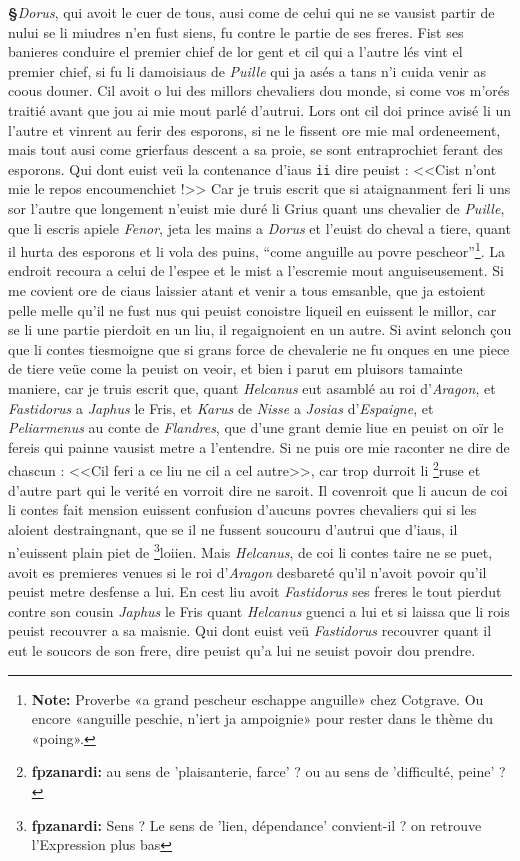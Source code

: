 \documentclass[12pt]{article} %
\newcommand{\persName}[1]{\emph{#1}} %
\newcommand{\placeName}[1]{\emph{#1}} %
\newcommand{\num}[1]{\texttt{#1}}    %
\newcommand{\supplied}[1]{\textlangle#1\textrangle} %
\newcommand{\fnnote}[1]{\footnote{\textbf{Note:} #1}} %
\newcommand{\fnfpz}[1]{\footnote{\textbf{fpzanardi:} #1}} %
\newcommand{\del}[1]{\sout{#1}}      %
\newcounter{paranum}
\newcommand{\pnum}{\stepcounter{paranum}\textbf{§\arabic{paranum}}\quad}
\begin{document}
\pnum \persName{Dorus}, qui avoit le cuer de tous, ausi come de celui qui ne se vausist partir de nului se li miudres n'en fust siens, fu contre le partie de ses freres. Fist ses banieres conduire el premier chief de lor gent et cil qui a l'autre lés vint el premier chief, si fu li damoisiaus de \placeName{Puille} qui ja asés a tans n'i cuida venir as coous douner. Cil avoit o lui des millors chevaliers dou monde, si come vos m'orés traitié avant que jou ai mie mout parlé d'autrui. Lors ont cil doi prince avisé li un l'autre et vinrent au ferir des esporons, si ne le fissent ore mie mal ordeneement, mais tout ausi come g\del{r}ierfaus descent a sa proie, se sont entraprochiet ferant des esporons. Qui dont euist veü la contenance d'iaus \num{ii} dire peuist : <<Cist n'ont mie le repos encoumenchiet !>> Car je truis escrit que si ataignanment feri li uns sor l'autre que longement n'euist mie duré li Grius quant uns chevalier de \placeName{Puille}, que li escris apiele \persName{Fenor}, jeta les mains a \persName{Dorus} et l'euist do cheval a tiere, quant il hurta des esporons et li vola des puins, ``come anguille au povre pescheor''\fnnote{Proverbe «a grand pescheur eschappe anguille» chez Cotgrave. Ou encore «anguille peschie, n'iert ja ampoignie» pour rester dans le thème du «poing».}. La endroit recoura a celui de l'espee et le mist a l'escremie mout anguiseuseme\supplied{n}t. Si me covient ore de ciaus laissier atant et venir a tous emsanble, que ja estoient pelle melle qu'il ne fust nus qui peuist conoistre liqueil en euissent le millor, car se li une partie pierdoit en un liu, il regaignoient en un autre. Si avint selonch çou que li contes tiesmoigne que si grans force de chevalerie ne fu onques en une piece de tiere veüe come la peuist on veoir, et bien i parut em pluisors tamai\supplied{n}te maniere, car je truis escrit que, quant \persName{Helcanus} eut asamblé au roi d'\placeName{Aragon}, et \persName{Fastidorus} a \persName{Japhus} le Fris, et \persName{Karus} de \placeName{Nisse} a \persName{Josias} d'\placeName{Espaigne}, et \persName{Peliarmenus} au conte de \placeName{Flandres}, que d'une grant demie liue en peuist on oïr le fereis qui painne vausist metre a l'entendre. Si ne puis ore mie raconter ne dire de chascun : <<Cil feri a ce liu ne cil a cel autre>>, car trop durroit li \fnfpz{au sens de 'plaisanterie, farce' ? ou au sens de 'difficulté, peine' ?}ruse et d'autre part qui le verité en vorroit dire ne saroit. Il covenroit que li aucun de coi li contes fait mension euissent confusion d'aucuns povres chevaliers qui si les aloient destraingnant, que se il ne fussent soucouru d'autrui que d'iaus, il n'euissent plain piet de \fnfpz{Sens ? Le sens de 'lien, dépendance' convient-il ? on retrouve l'Expression plus bas}loiien. Mais \persName{Helcanus}, de coi li contes taire ne se puet, avoit es premieres venues si le roi d'\placeName{Aragon} desbareté qu'il n'avoit povoir qu'il peuist metre desfense a lui. En cest liu avoit \persName{Fastidorus} ses f\supplied{re}res le tout pierdut contre son cousin \persName{Japhus} le Fris quant \persName{Helcanus} guenci a lui et si laissa que li rois peuist recouvrer a sa maisnie. Qui dont euist veü \persName{Fastidorus} recouvrer quant il eut le soucors de son frere, dire peuist q\supplied{u}'a lui ne seuist povoir dou prendre.
\end{document}
